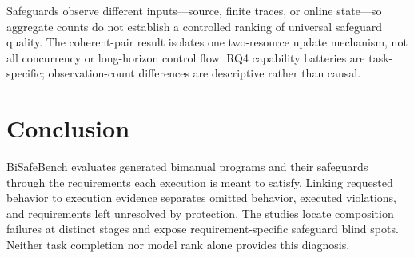 \documentclass[letterpaper,10pt,conference]{ieeeconf}
\begin{document}
Safeguards observe different inputs---source, finite traces, or online state---so aggregate counts do not establish a controlled ranking of universal safeguard quality. The coherent-pair result isolates one two-resource update mechanism, not all concurrency or long-horizon control flow. RQ4 capability batteries are task-specific; observation-count differences are descriptive rather than causal.

\section{Conclusion}
BiSafeBench evaluates generated bimanual programs and their safeguards through the requirements each execution is meant to satisfy. Linking requested behavior to execution evidence separates omitted behavior, executed violations, and requirements left unresolved by protection. The studies locate composition failures at distinct stages and expose requirement-specific safeguard blind spots. Neither task completion nor model rank alone provides this diagnosis.


\end{document}
